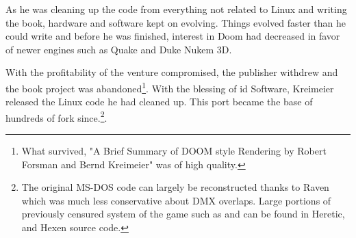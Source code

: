 \par
 As he was cleaning up the code from everything not related to Linux and writing the book, hardware and software kept on evolving. Things evolved faster than he could write and before he was finished, interest in Doom had decreased in favor of newer engines such as Quake and Duke Nukem 3D.\\
 \par
  With the profitability of the venture compromised, the publisher withdrew and the book project was abandoned\footnote{What survived, "A Brief Summary of DOOM style Rendering by Robert Forsman and Bernd Kreimeier" was of high quality.}. With the blessing of id Software, Kreimeier released the Linux code he had cleaned up. This port became the base of hundreds of fork since.\footnote{The original MS-DOS code can largely be reconstructed thanks to Raven which was much less conservative about DMX overlaps. Large portions of previously censured system of the game such as  and  can be found in Heretic, and Hexen source code.}.\\
 \par  



